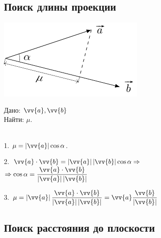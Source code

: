 \documentclass[10pt]{beamer}
\begin{document}
\subsection{Поиск длины проекции}

{
	{

		\includegraphics{projectionlength.pdf}
	}
	{
		Дано: $\vv{a}, \vv{b}$ \\
		Найти: $\mu$. \\ ~ \\
		
		\pause
		
		1. $\mu = |\vv{a}|\cos\alpha$.
		
		\pause
		
		2. $\vv{a}\cdot\vv{b} = \ABS{\vv{a}}\ABS{\vv{b}}\cos \alpha \Rightarrow $ \\
		$ \Rightarrow \cos \alpha = \displaystyle\frac{\vv{a}\cdot\vv{b}}{\ABS{\vv{a}}\ABS{\vv{b}}} $
		
		\pause
		
		3. $\displaystyle \mu=\ABS{ \vv{a} } \frac{\vv{a}\cdot\vv{b}}{\ABS{\vv{a}}\ABS{\vv{b}}} =  \vv{a} \frac{\vv{b}}{\ABS{ \vv{b} }  } $
		
			
	}
}

\subsection{Поиск расстояния до плоскости}
\end{document}
